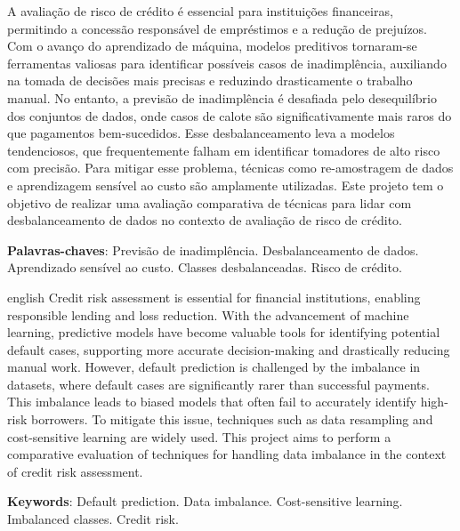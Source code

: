 
\setlength{\absparsep}{18pt} %
\begin{resumo}
    A avaliação de risco de crédito é essencial para instituições financeiras,
    permitindo a concessão responsável de empréstimos e a redução de prejuízos. Com
    o avanço do aprendizado de máquina, modelos preditivos tornaram-se
    ferramentas valiosas para identificar possíveis casos de inadimplência, auxiliando
    na tomada de decisões mais precisas e reduzindo drasticamente o trabalho manual.
    No entanto, a previsão de inadimplência é desafiada pelo desequilíbrio dos conjuntos
    de dados, onde casos de calote são significativamente mais raros do que
    pagamentos bem-sucedidos. Esse desbalanceamento leva a modelos tendenciosos,
    que frequentemente falham em identificar tomadores de alto risco com
    precisão. Para mitigar esse problema, técnicas como re-amostragem de dados e
    aprendizagem sensível ao custo são amplamente utilizadas. Este projeto tem o
    objetivo de realizar uma avaliação comparativa de técnicas para lidar com desbalanceamento
    de dados no contexto de avaliação de risco de crédito.

    \textbf{Palavras-chaves}: Previsão de inadimplência. Desbalanceamento de
    dados. Aprendizado sensível ao custo. Classes desbalanceadas. Risco de crédito.
\end{resumo}

\begin{resumo}
    [Abstract]
    \begin{otherlanguage*}
        {english} Credit risk assessment is essential for financial institutions,
        enabling responsible lending and loss reduction. With the advancement of
        machine learning, predictive models have become valuable tools for
        identifying potential default cases, supporting more accurate decision-making
        and drastically reducing manual work. However, default prediction is challenged
        by the imbalance in datasets, where default cases are significantly
        rarer than successful payments. This imbalance leads to biased models that
        often fail to accurately identify high-risk borrowers. To mitigate this
        issue, techniques such as data resampling and cost-sensitive learning are
        widely used. This project aims to perform a comparative evaluation of
        techniques for handling data imbalance in the context of credit risk
        assessment.

        \vspace{\onelineskip}

        \noindent
        \textbf{Keywords}: Default prediction. Data imbalance. Cost-sensitive learning.
        Imbalanced classes. Credit risk.
    \end{otherlanguage*}
\end{resumo}